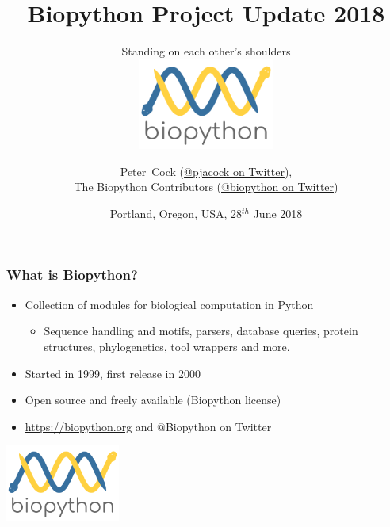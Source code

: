 

\usepackage{multicol}

\title[Biopython Project Update 2018] %
{Biopython Project Update 2018}
\subtitle{Standing on each other's shoulders \\ \includegraphics[height=3cm]{images/biopython_logo_m.png}}
\author[Cock] %
{Peter~Cock (\href{https://twitter.com/pjacock}{@pjacock on Twitter}), \\
The Biopython Contributors (\href{https://twitter.com/Biopython}{@biopython on Twitter})}
\date[June 2018] %
{Portland, Oregon, USA, 28$^{th}$ June 2018}
\subject{Bioinformatics}



\frame[plain]{\titlepage}

\begin{frame}
  \frametitle{What is Biopython?}

  \begin{itemize}
  \item Collection of modules for biological computation in Python
  \begin{itemize}
  \item Sequence handling and motifs, parsers, database queries, protein structures, phylogenetics, tool wrappers and more.
  \end{itemize}
  \item Started in 1999, first release in 2000
  \item Open source and freely available (Biopython license)
  \item \url{https://biopython.org} and @Biopython on Twitter
  \end{itemize}

\center
\includegraphics[height=2.5cm]{images/biopython_logo_m.png}
\end{frame}


